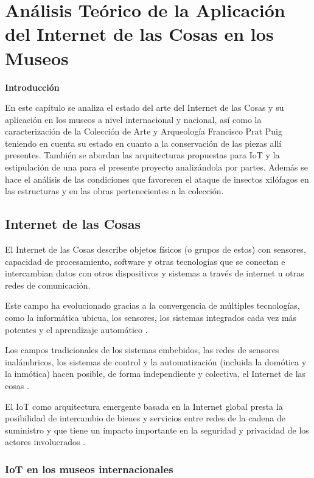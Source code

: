 \chapter{Análisis Teórico de la Aplicación del Internet de las Cosas en los Museos} \label{cap:analisis_teorico}

        \textbf{\Large Introducción}\newline

        En este capítulo se analiza el estado del arte del Internet de las Cosas y su aplicación en los museos a nivel internacional y nacional, así como la caracterización de la
        Colección de Arte y Arqueología Francisco Prat Puig teniendo en cuenta su estado en cuanto a la conservación de las piezas allí presentes. También se abordan las arquitecturas propuestas para IoT y la estipulación de una para el presente proyecto analizándola por partes.
        Además se hace el análisis de las condiciones que favorecen el ataque de insectos xilófagos en las estructuras y en las obras pertenecientes a la colección. 

    \section{Internet de las Cosas}

    El Internet de las Cosas describe objetos físicos (o grupos de estos) con sensores, capacidad de procesamiento, software y otras tecnologías que se conectan e intercambian datos con otros dispositivos y sistemas a través de internet u otras redes de comunicación.

    Este campo ha evolucionado gracias a la convergencia de múltiples tecnologías, como la informática ubicua, los sensores, los sistemas integrados cada vez más potentes y el aprendizaje automático \cite{carrasco}. 

    Los campos tradicionales de los sistemas embebidos, las redes de sensores inalámbricos, los sistemas de control y la automatización (incluida la domótica y la inmótica) hacen posible, de forma independiente y colectiva, el Internet de las cosas \cite{lennox}.

    El IoT como arquitectura emergente basada en la Internet global presta la posibilidad de intercambio de bienes y servicios entre redes de la cadena de suministro y que tiene un impacto importante en la seguridad y privacidad de los actores involucrados \cite{weber}. 

    \subsection{IoT en los museos internacionales}\label{sec:iotMundo}
        
